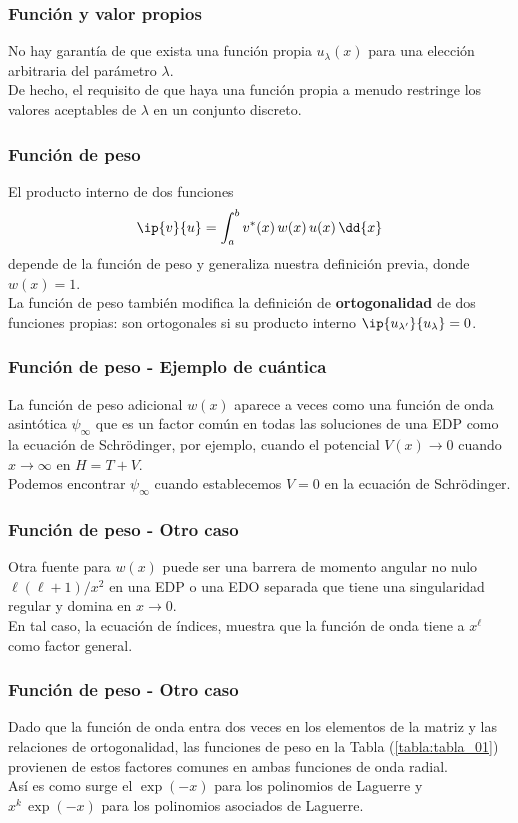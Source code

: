 \begin{frame}
\frametitle{Función y valor propios}
No hay garantía de que exista una función propia $u_{\lambda} (x)$ para una elección arbitraria del parámetro $\lambda$.
\\
\bigskip
\pause
De hecho, el requisito de que haya una función propia a menudo restringe los valores aceptables de $\lambda$ en un conjunto discreto. 
\end{frame}
\begin{frame}
\frametitle{Función de peso}
El producto interno de dos funciones
\begin{align*}
\ip{v}{u} = \int_{a}^{b} v^{*}(x) \, w(x) \, u(x) \, \dd{x}
\end{align*}
depende de la función de peso y generaliza nuestra definición previa, donde $w(x) = 1$.
\\
\bigskip
\pause
La función de peso también modifica la definición de \textbf{ortogonalidad} de dos funciones propias: son ortogonales si su producto interno $\ip{u_{\lambda^{\prime}}}{u_{\lambda}} = 0$.
\end{frame}
\begin{frame}
\frametitle{Función de peso - Ejemplo de cuántica}
La función de peso adicional $w(x)$ aparece a veces como una función de onda asintótica $\psi_{\infty}$ que es un factor común en todas las soluciones de una EDP como la ecuación de Schrödinger, por ejemplo, cuando el potencial $V(x) \to 0$ cuando $x \to \infty$ en $H = T + V$. 
\\
\bigskip
\pause
Podemos encontrar $\psi_{\infty}$ cuando establecemos $V = 0$ en la ecuación de Schrödinger.
\end{frame}
\begin{frame}
\frametitle{Función de peso - Otro caso}
Otra fuente para $w(x)$ puede ser una barrera de momento angular no nulo $\ell (\ell +1)/x^{2}$ en una EDP o una EDO separada que tiene una singularidad regular y domina en $x \to 0$. 
\\
\bigskip
En tal caso, la ecuación de índices, muestra que la función de onda tiene a $x^{\ell}$ como factor general.
\end{frame}
\begin{frame}
\frametitle{Función de peso - Otro caso}
Dado que la función de onda entra dos veces en los elementos de la matriz y las relaciones de ortogonalidad, las funciones de peso en la Tabla (\ref{tabla:tabla_01}) provienen de estos factores comunes en ambas funciones de onda radial.
\\
\bigskip
\pause
Así es como surge el $\exp(-x)$ para los polinomios de Laguerre y $x^{k} \, \exp(-x)$ para los polinomios asociados de Laguerre.
\end{frame}
